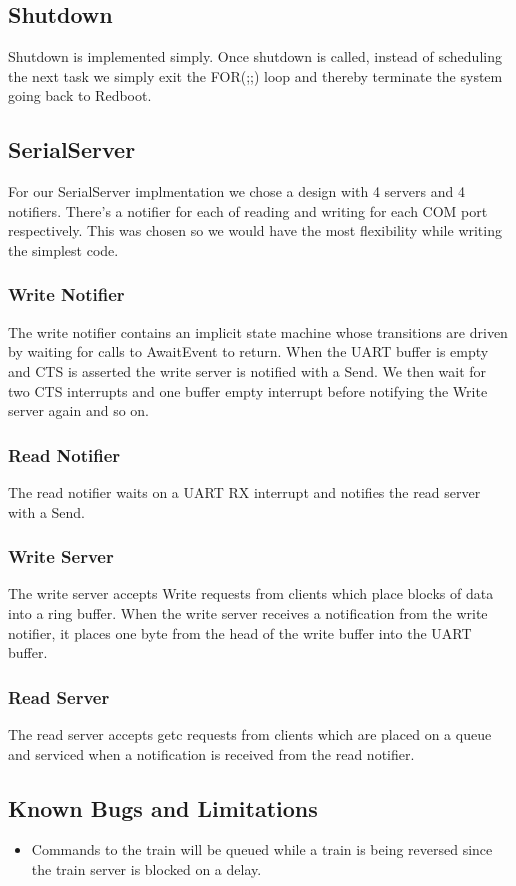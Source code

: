 \documentclass{article}
\begin{document}
\subsection{Shutdown}

Shutdown is implemented simply. Once shutdown is called, instead of scheduling the next task we simply exit the FOR(;;) loop and thereby terminate the system going back to Redboot.

\subsection{SerialServer}

For our SerialServer implmentation we chose a design with 4 servers and 4 notifiers. There's a notifier for each of reading and writing for each COM port respectively. This was chosen so we would have the most flexibility while writing the simplest code.

\subsubsection{Write Notifier}

The write notifier contains an implicit state machine whose transitions are driven by waiting for calls to AwaitEvent to return. When the UART buffer is empty and CTS is asserted the write server is notified with a Send. We then wait for two CTS interrupts and one buffer empty interrupt before notifying the Write server again and so on.

\subsubsection{Read Notifier}

The read notifier waits on a UART RX interrupt and notifies the read server with a Send.

\subsubsection{Write Server}

The write server accepts Write requests from clients which place blocks of data into a ring buffer. When the write server receives a notification from the write notifier, it places one byte from the head of the write buffer into the UART buffer.

\subsubsection{Read Server}

The read server accepts getc requests from clients which are placed on a queue and serviced when a notification is received from the read notifier.

\subsection{Known Bugs and Limitations}
\begin{itemize}
\item Commands to the train will be queued while a train is being reversed since the train server is blocked on a delay.
\end{itemize}
\end{document}
